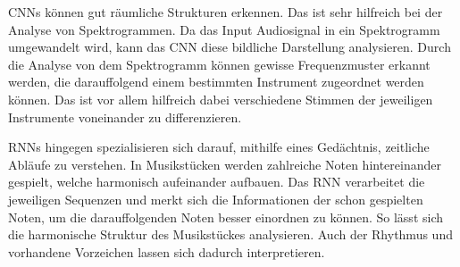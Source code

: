 CNNs können gut räumliche Strukturen erkennen.
Das ist sehr hilfreich bei der Analyse von Spektrogrammen.
Da das Input Audiosignal in ein Spektrogramm umgewandelt wird,
kann das CNN diese bildliche Darstellung analysieren.
Durch die Analyse von dem Spektrogramm können gewisse Frequenzmuster erkannt werden,
die darauffolgend einem bestimmten Instrument zugeordnet werden können.
Das ist vor allem hilfreich dabei verschiedene Stimmen der jeweiligen Instrumente voneinander zu differenzieren.
\cite{han2016deep}

RNNs hingegen spezialisieren sich darauf, mithilfe eines Gedächtnis, zeitliche Abläufe zu verstehen.
In Musikstücken werden zahlreiche Noten hintereinander gespielt, welche harmonisch aufeinander aufbauen.
Das RNN verarbeitet die jeweiligen Sequenzen und merkt sich die Informationen der schon gespielten Noten,
um die darauffolgenden Noten besser einordnen zu können.
So lässt sich die harmonische Struktur des Musikstückes analysieren.
Auch der Rhythmus und vorhandene Vorzeichen lassen sich dadurch interpretieren.
\cite{Boeck2012}

